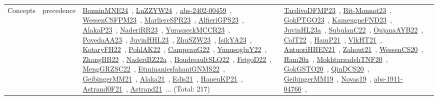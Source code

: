 {\begin{longtable}{lp{3cm}>{\raggedright\arraybackslash}p{6cm}>{\raggedright\arraybackslash}p{6cm}>{\raggedright\arraybackslash}p{8cm}}
\index{precedence}\index{Concepts!precedence}Concepts & precedence & \href{../works/BonninMNE24.pdf}{BonninMNE24}~\cite{BonninMNE24}, \href{../works/LuZZYW24.pdf}{LuZZYW24}~\cite{LuZZYW24}, \href{../works/abs-2402-00459.pdf}{abs-2402-00459}~\cite{abs-2402-00459}, \href{../works/WessenCSFPM23.pdf}{WessenCSFPM23}~\cite{WessenCSFPM23}, \href{../works/MarliereSPR23.pdf}{MarliereSPR23}~\cite{MarliereSPR23}, \href{../works/AlfieriGPS23.pdf}{AlfieriGPS23}~\cite{AlfieriGPS23}, \href{../works/AlakaP23.pdf}{AlakaP23}~\cite{AlakaP23}, \href{../works/NaderiRR23.pdf}{NaderiRR23}~\cite{NaderiRR23}, \href{../works/YuraszeckMCCR23.pdf}{YuraszeckMCCR23}~\cite{YuraszeckMCCR23}, \href{../works/PovedaAA23.pdf}{PovedaAA23}~\cite{PovedaAA23}, \href{../works/JuvinHHL23.pdf}{JuvinHHL23}~\cite{JuvinHHL23}, \href{../works/ZhuSZW23.pdf}{ZhuSZW23}~\cite{ZhuSZW23}, \href{../works/IsikYA23.pdf}{IsikYA23}~\cite{IsikYA23}, \href{../works/KotaryFH22.pdf}{KotaryFH22}~\cite{KotaryFH22}, \href{../works/PohlAK22.pdf}{PohlAK22}~\cite{PohlAK22}, \href{../works/CampeauG22.pdf}{CampeauG22}~\cite{CampeauG22}, \href{../works/YunusogluY22.pdf}{YunusogluY22}~\cite{YunusogluY22}, \href{../works/ZhangBB22.pdf}{ZhangBB22}~\cite{ZhangBB22}, \href{../works/NaderiBZ22a.pdf}{NaderiBZ22a}~\cite{NaderiBZ22a}, \href{../works/BoudreaultSLQ22.pdf}{BoudreaultSLQ22}~\cite{BoudreaultSLQ22}, \href{../works/FetgoD22.pdf}{FetgoD22}~\cite{FetgoD22}, \href{../works/MengGRZSC22.pdf}{MengGRZSC22}~\cite{MengGRZSC22}, \href{../works/EtminaniesfahaniGNMS22.pdf}{EtminaniesfahaniGNMS22}~\cite{EtminaniesfahaniGNMS22}, \href{../works/GeibingerMM21.pdf}{GeibingerMM21}~\cite{GeibingerMM21}, \href{../works/Alaka21.pdf}{Alaka21}~\cite{Alaka21}, \href{../works/Edis21.pdf}{Edis21}~\cite{Edis21}, \href{../works/HanenKP21.pdf}{HanenKP21}~\cite{HanenKP21}, \href{../works/Astrand0F21.pdf}{Astrand0F21}~\cite{Astrand0F21}, \href{../works/Astrand21.pdf}{Astrand21}~\cite{Astrand21}... (Total: 217) & \href{../works/TardivoDFMP23.pdf}{TardivoDFMP23}~\cite{TardivoDFMP23}, \href{../works/Bit-Monnot23.pdf}{Bit-Monnot23}~\cite{Bit-Monnot23}, \href{../works/GokPTGO23.pdf}{GokPTGO23}~\cite{GokPTGO23}, \href{../works/KameugneFND23.pdf}{KameugneFND23}~\cite{KameugneFND23}, \href{../works/JuvinHL23a.pdf}{JuvinHL23a}~\cite{JuvinHL23a}, \href{../works/SubulanC22.pdf}{SubulanC22}~\cite{SubulanC22}, \href{../works/OujanaAYB22.pdf}{OujanaAYB22}~\cite{OujanaAYB22}, \href{../works/ColT22.pdf}{ColT22}~\cite{ColT22}, \href{../works/HamP21.pdf}{HamP21}~\cite{HamP21}, \href{../works/VlkHT21.pdf}{VlkHT21}~\cite{VlkHT21}, \href{../works/AntuoriHHEN21.pdf}{AntuoriHHEN21}~\cite{AntuoriHHEN21}, \href{../works/Zahout21.pdf}{Zahout21}~\cite{Zahout21}, \href{../works/WessenCS20.pdf}{WessenCS20}~\cite{WessenCS20}, \href{../works/Ham20a.pdf}{Ham20a}~\cite{Ham20a}, \href{../works/MokhtarzadehTNF20.pdf}{MokhtarzadehTNF20}~\cite{MokhtarzadehTNF20}, \href{../works/GokGSTO20.pdf}{GokGSTO20}~\cite{GokGSTO20}, \href{../works/QinDCS20.pdf}{QinDCS20}~\cite{QinDCS20}, \href{../works/GeibingerMM19.pdf}{GeibingerMM19}~\cite{GeibingerMM19}, \href{../works/Novas19.pdf}{Novas19}~\cite{Novas19}, \href{../works/abs-1911-04766.pdf}{abs-1911-04766}~\cite{abs-1911-04766}, 
\end{longtable}}
